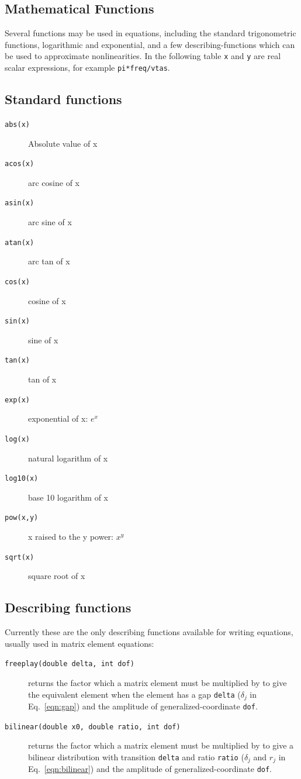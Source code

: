 \documentclass[10pt,openany,twoside]{book}
\numberwithin{equation}{section}   %
\newcommand{\Code}[1]{{\small\tt #1}}
\newcommand{\Eqn}[1]{Eq.\ \ref{#1}}
\begin{document}
\subsection{Mathematical Functions}\label{sect:bifcn}
Several functions may be used in equations, including the
standard trigonometric functions, logarithmic and exponential,
and a few describing-functions which can be used to approximate
nonlinearities.
In the following table \Code{x} and \Code{y}
are real scalar expressions, for example \Code{pi*freq/vtas}.

\subsection{Standard functions}
\begin{description}
	\item[\Code{abs(x)}] Absolute value of x 
	\item[\Code{acos(x)}] arc cosine of x 
	\item[\Code{asin(x)}] arc sine of x 
	\item[\Code{atan(x)}] arc tan of x 
	\item[\Code{cos(x)}] cosine of x 
	\item[\Code{sin(x)}] sine of x 
	\item[\Code{tan(x)}] tan of x 
	\item[\Code{exp(x)}] exponential of x: $e^x$ 
	\item[\Code{log(x)}] natural logarithm of x 
	\item[\Code{log10(x)}] base 10 logarithm of x 
	\item[\Code{pow(x,y)}] x raised to the y power: $x^y$ 
	\item[\Code{sqrt(x)}] square root of x 
\end{description}

\subsection{Describing functions}\label{sect:eqn-df}
Currently these are the only describing functions available for
writing equations, usually used in matrix element equations:

\begin{description}
\item[\Code{freeplay(double delta, int dof)}]
   returns the factor which a matrix element must be multiplied
	by to give the equivalent element when the element has a gap
	\Code{delta} ($\delta_j$ in \Eqn{eqn:gap}) and the amplitude of
	generalized-coordinate \Code{dof}. 
\item[\Code{bilinear(double x0, double ratio, int dof)}]
returns the factor which a matrix element must be multiplied by to give
a bilinear distribution with transition \Code{delta} and ratio \Code{ratio}
($\delta_j$ and $r_j$ in \Eqn{eqn:bilinear}) and the amplitude of
generalized-coordinate \Code{dof}.
\end{description}
\end{document}
